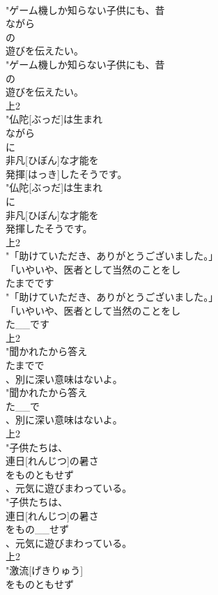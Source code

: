 \documentclass[8pt]{extreport}
\begin{document}
\begin{CJK}{UTF8}{min}
\\	"ゲーム機しか知らない子供にも、昔
\\	ながら
\\	の
\\	遊びを伝えたい。
\\	"ゲーム機しか知らない子供にも、昔
\\	の
\\	遊びを伝えたい。
\\	上2
\\	"仏陀[ぶっだ]は生まれ
\\	ながら
\\	に
\\	非凡[ひぼん]な才能を
\\	発揮[はっき]したそうです。
\\	"仏陀[ぶっだ]は生まれ
\\	に
\\	非凡[ひぼん]な才能を
\\	発揮したそうです。
\\	上2
\\	"「助けていただき、ありがとうございました。」
\\	「いやいや、医者として当然のことをし
\\	たまでです
\\	"「助けていただき、ありがとうございました。」
\\	「いやいや、医者として当然のことをし
\\	た__です
\\	上2
\\	"聞かれたから答え
\\	たまでで
\\	、別に深い意味はないよ。
\\	"聞かれたから答え
\\	た__で
\\	、別に深い意味はないよ。
\\	上2
\\	"子供たちは、
\\	連日[れんじつ]の暑さ
\\	をものともせず
\\	、元気に遊びまわっている。
\\	"子供たちは、
\\	連日[れんじつ]の暑さ
\\	をもの__せず
\\	、元気に遊びまわっている。
\\	上2
\\	"激流[げきりゅう]
\\	をものともせず

\end{CJK}
\end{document}

